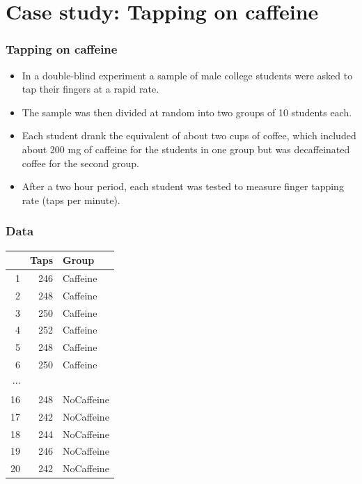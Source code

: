 \documentclass[11pt,containsverbatim,handout,xcolor=xelatex,dvipsnames,table]{beamer}
\begin{document}

\section{Case study: Tapping on caffeine}


\begin{frame}
\frametitle{Tapping on caffeine}

\begin{itemize}

\item In a double-blind experiment a sample of male college students were asked to tap their fingers at a rapid rate. 

\item The sample was then divided at random into two groups of 10 students each. 

\item Each student drank the equivalent of about two cups of coffee, which included about 200 mg of caffeine for the students in one group but was decaffeinated coffee for the second group. 

\item After a two hour period, each student was tested to measure finger tapping rate (taps per minute). 

\end{itemize}

\end{frame}


\begin{frame}
\frametitle{Data}

\begin{center}
\begin{tabular}{rrl}
  \hline
 & Taps & Group \\ 
  \hline
1 & 246 & Caffeine \\ 
  2 & 248 & Caffeine \\ 
  3 & 250 & Caffeine \\ 
  4 & 252 & Caffeine \\ 
  5 & 248 & Caffeine \\ 
  6 & 250 & Caffeine \\ 
$\cdots$ && \\
  16 & 248 & NoCaffeine \\ 
  17 & 242 & NoCaffeine \\ 
  18 & 244 & NoCaffeine \\ 
  19 & 246 & NoCaffeine \\ 
  20 & 242 & NoCaffeine \\ 
   \hline
\end{tabular}
\end{center}

\end{frame}
\end{document}
